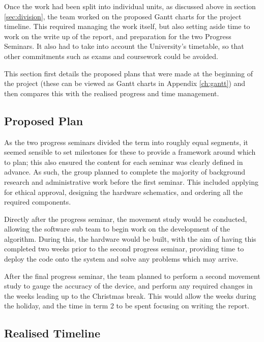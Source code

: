 
Once the work had been split into individual units, as discussed above in section \ref{sec:division}, the team worked on the proposed Gantt charts for the project timeline. This required managing the work itself, but also setting aside time to work on the write up of the report, and preparation for the two Progress Seminars. It also had to take into account the University's timetable, so that other commitments such as exams and coursework could be avoided.

This section first details the proposed plans that were made at the beginning of the project (these can be viewed as Gantt charts in Appendix \ref{ch:gantt}) and then compares this with the realised progress and time management.

\subsection{Proposed Plan}

As the two progress seminars divided the term into roughly equal segments, it seemed sensible to set milestones for these to provide a framework around which to plan; this also ensured the content for each seminar was clearly defined in advance. As such, the group planned to complete the majority of background research and administrative work before the first seminar. This included applying for ethical approval, designing the hardware schematics, and ordering all the required components.

Directly after the progress seminar, the movement study would be conducted, allowing the software sub team to begin work on the development of the algorithm. During this, the hardware would be built, with the aim of having this completed two weeks prior to the second progress seminar, providing time to deploy the code onto the system and solve any problems which may arrive.

After the final progress seminar, the team planned to perform a second movement study to gauge the accuracy of the device, and perform any required changes in the weeks leading up to the Christmas break. This would allow the weeks during the holiday, and the time in term 2 to be spent focusing on writing the report.

\subsection{Realised Timeline}


